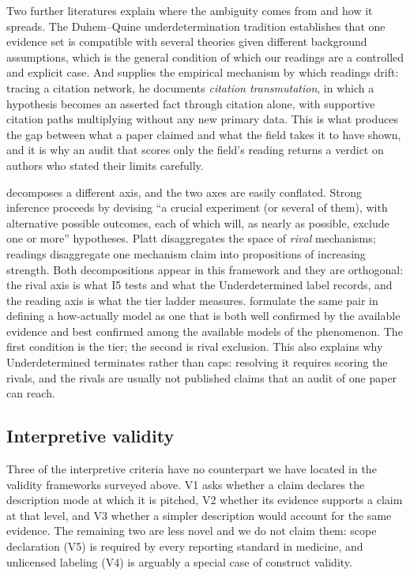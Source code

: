 \documentclass{article}
\begin{document}
Two further literatures explain where the ambiguity comes from and how it spreads. The Duhem--Quine underdetermination tradition establishes that one evidence set is compatible with several theories given different background assumptions, which is the general condition of which our readings are a controlled and explicit case. And \citet{greenberg2009citation} supplies the empirical mechanism by which readings drift: tracing a citation network, he documents \emph{citation transmutation}, in which a hypothesis becomes an asserted fact through citation alone, with supportive citation paths multiplying without any new primary data. This is what produces the gap between what a paper claimed and what the field takes it to have shown, and it is why an audit that scores only the field's reading returns a verdict on authors who stated their limits carefully.

\citet{platt1964strong} decomposes a different axis, and the two axes are easily conflated. Strong inference proceeds by devising ``a crucial experiment (or several of them), with alternative possible outcomes, each of which will, as nearly as possible, exclude one or more'' hypotheses. Platt disaggregates the space of \emph{rival} mechanisms; readings disaggregate one mechanism claim into propositions of increasing strength. Both decompositions appear in this framework and they are orthogonal: the rival axis is what I5 tests and what the Underdetermined label records, and the reading axis is what the tier ladder measures. \citet{colombo2015models} formulate the same pair in defining a how-actually model as one that is both well confirmed by the available evidence and best confirmed among the available models of the phenomenon. The first condition is the tier; the second is rival exclusion. This also explains why Underdetermined terminates rather than caps: resolving it requires scoring the rivals, and the rivals are usually not published claims that an audit of one paper can reach.

\subsection{Interpretive validity}
\label{sec:related-interpretive}

Three of the interpretive criteria have no counterpart we have located in the validity frameworks surveyed above. V1 asks whether a claim declares the description mode at which it is pitched, V2 whether its evidence supports a claim at that level, and V3 whether a simpler description would account for the same evidence. The remaining two are less novel and we do not claim them: scope declaration (V5) is required by every reporting standard in medicine, and unlicensed labeling (V4) is arguably a special case of construct validity.
\end{document}
